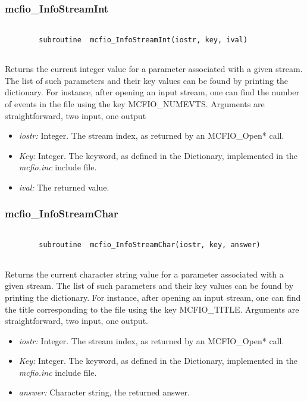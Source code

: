 \subsubsection{mcfio\_InfoStreamInt}

\begin{verbatim}

        subroutine  mcfio_InfoStreamInt(iostr, key, ival)
    
\end{verbatim}

Returns the current integer value for a parameter associated with a 
given stream. The list of such parameters and their key values 
can be found by printing the dictionary. For instance, after opening 
an input stream, one can find the number of events in the file 
using the key MCFIO\_NUMEVTS. Arguments are straightforward, two input,
one output

\begin{itemize}
\item {\em iostr:} Integer. The stream index, as returned by an MCFIO\_Open* 
call.
\item {\em Key:} Integer. The keyword, as defined in the Dictionary, 
implemented in the {\em mcfio.inc} include file. 
\item {\em ival:} The  returned value.
\end{itemize}

 
\subsubsection{mcfio\_InfoStreamChar}

\begin{verbatim}

        subroutine  mcfio_InfoStreamChar(iostr, key, answer)
    
\end{verbatim}

Returns the current character string value for a parameter associated 
with a given stream. The list of such parameters and their key values 
can be found by printing the dictionary. For instance, after opening 
an input stream, one can find the title corresponding to the file 
using the key MCFIO\_TITLE. Arguments are straightforward, two input,
one output.

\begin{itemize}
\item {\em iostr:} Integer. The stream index, as returned by an MCFIO\_Open* 
call.
\item {\em Key:} Integer. The keyword, as defined in the Dictionary, 
implemented in the {\em mcfio.inc} include file. 
\item {\em answer:} Character string,  the  returned answer.
\end{itemize}
	

